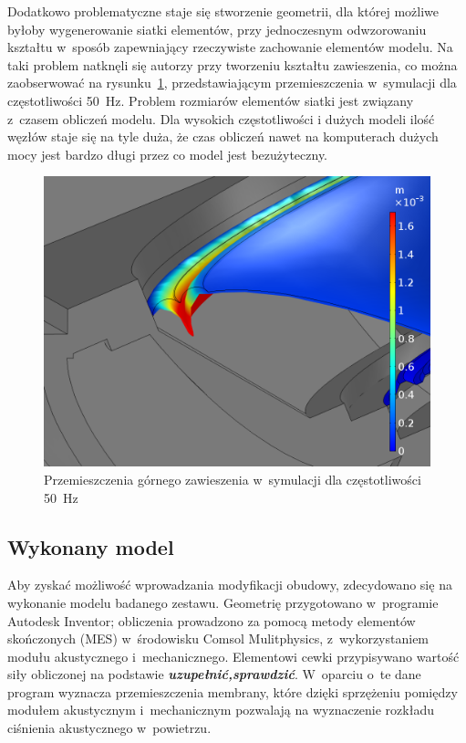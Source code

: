 \documentclass[12pt]{oska}
\newcommand{\comment}[1]{{\color{magenta}\emph{\textbf{#1}}}}
\begin{document}
		Dodatkowo problematyczne staje się stworzenie geometrii, dla której możliwe byłoby wygenerowanie siatki elementów, przy jednoczesnym odwzorowaniu kształtu w~sposób zapewniający rzeczywiste zachowanie elementów modelu. Na taki problem natknęli się autorzy przy tworzeniu kształtu zawieszenia, co można zaobserwować na rysunku~\ref{r:zawieszenie}, przedstawiającym przemieszczenia w~symulacji dla częstotliwości \SI{50}{\hertz}. Problem rozmiarów elementów siatki jest związany z~czasem obliczeń modelu. Dla wysokich częstotliwości i dużych modeli ilość węzłów staje się na tyle duża, że czas obliczeń nawet na komputerach dużych mocy jest bardzo długi przez co model jest bezużyteczny.
		
		\begin{figure}[!ht]
			\centering
			\includegraphics[width=.8\textwidth]{disp_factor5_f50_02.png}
			\caption{Przemieszczenia górnego zawieszenia w~symulacji dla częstotliwości \SI{50}{\hertz}}
			\label{r:zawieszenie}
		\end{figure}
		
	\subsection{Wykonany model}
	
		Aby zyskać możliwość wprowadzania modyfikacji obudowy, zdecydowano się na wykonanie modelu badanego zestawu. Geometrię przygotowano w~programie Autodesk Inventor; obliczenia prowadzono za pomocą metody elementów skończonych (MES) w~środowisku Comsol Mulitphysics, z~wykorzystaniem modułu akustycznego i~mechanicznego. Elementowi cewki przypisywano wartość siły obliczonej na podstawie \comment{uzupełnić,sprawdzić}. W~oparciu o~te dane program wyznacza przemieszczenia membrany, które dzięki sprzężeniu pomiędzy modułem akustycznym i~mechanicznym pozwalają na wyznaczenie rozkładu ciśnienia akustycznego w~powietrzu.
		
\end{document}
